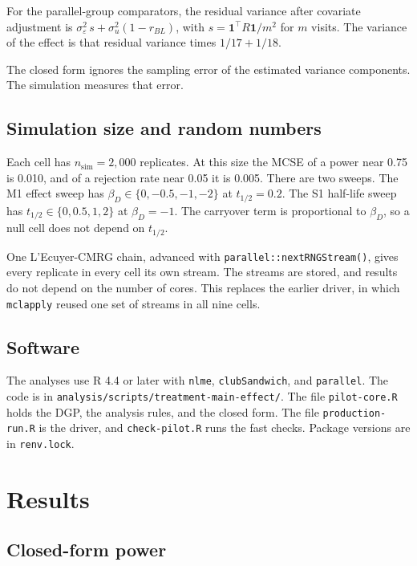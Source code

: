 \documentclass[
  11pt,
]{article}
\begin{document}
For the parallel-group comparators, the residual variance after covariate adjustment is \(\sigma_\varepsilon^2\, s + \sigma_u^2(1 - r_{BL})\), with \(s = \mathbf 1^\top R \mathbf 1/m^2\) for \(m\) visits. The variance of the effect is that residual variance times \(1/17 + 1/18\).

The closed form ignores the sampling error of the estimated variance components. The simulation measures that error.

\subsection{Simulation size and random numbers}\label{simulation-size-and-random-numbers}

Each cell has \(n_{\mathrm{sim}} = 2{,}000\) replicates. At this size the MCSE of a power near 0.75 is 0.010, and of a rejection rate near 0.05 it is 0.005. There are two sweeps. The M1 effect sweep has \(\beta_D \in \{0, -0.5, -1, -2\}\) at \(t_{1/2} = 0.2\). The S1 half-life sweep has \(t_{1/2} \in \{0, 0.5, 1, 2\}\) at \(\beta_D = -1\). The carryover term is proportional to \(\beta_D\), so a null cell does not depend on \(t_{1/2}\).

One L'Ecuyer-CMRG chain, advanced with \texttt{parallel::nextRNGStream()}, gives every replicate in every cell its own stream. The streams are stored, and results do not depend on the number of cores. This replaces the earlier driver, in which \texttt{mclapply} reused one set of streams in all nine cells.

\subsection{Software}\label{software}

The analyses use R 4.4 or later with \texttt{nlme}, \texttt{clubSandwich}, and \texttt{parallel}. The code is in \texttt{analysis/scripts/treatment-main-effect/}. The file \texttt{pilot-core.R} holds the DGP, the analysis rules, and the closed form. The file \texttt{production-run.R} is the driver, and \texttt{check-pilot.R} runs the fast checks. Package versions are in \texttt{renv.lock}.

\section{Results}\label{results}

\subsection{Closed-form power}\label{closed-form-power-1}
\end{document}
